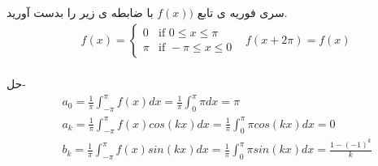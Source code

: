 \begin{example}
سری فوریه ی تابع
$f(x))$
با ضابطه ی زیر را بدست آورید.
\begin{align*}
&f(x)=
\begin{cases}
0 &\mbox{if } 0\le x\le \pi
\\
\pi &\mbox{if } -\pi\le x \le 0
\end{cases}
& f(x+2\pi)=f(x)
\end{align*}
\hrulefill
\\
حل-
\begin{equation*}
\begin{aligned}
{} &\ a_0=\frac{1}{\pi}\int_{-\pi}^{\pi}{f(x)dx}=\frac{1}{\pi}\int_{0}^{\pi}{\pi dx}=\pi\\
&\ a_k=\frac{1}{\pi}\int_{-\pi}^{\pi}{f(x)cos(kx)dx}=\frac{1}{\pi}\int_{0}^{\pi}{\pi cos(kx) dx}=0\\
&\ b_k=\frac{1}{\pi}\int_{-\pi}^{\pi}{f(x)sin(kx)dx}=\frac{1}{\pi}\int_{0}^{\pi}{\pi sin(kx) dx}=\frac{1-(-1)^k}{k}\\
\end{aligned}
\end{equation*}

\end{example}
\hrulefill